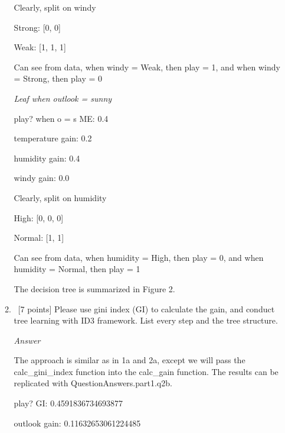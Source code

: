 \documentclass[12pt, fullpage,letterpaper]{article}
\begin{document}
\begin{enumerate}
\begin{enumerate}
    Clearly, split on windy
    
    \vspace{5mm}

    Strong: [0, 0]
    
    Weak: [1, 1, 1]
    
    \vspace{5mm}

    Can see from data, when windy = Weak, then play = 1, and when windy = Strong, then play = 0
    
    \vspace{5mm}
    \emph{Leaf when outlook = sunny}
    
    \vspace{5mm}
    
    play? when o = s ME:  0.4
    
    temperature gain: 0.2
    
    humidity gain: 0.4
    
    windy gain: 0.0
    
    \vspace{5mm}
    
    Clearly, split on humidity
    
    \vspace{5mm}
    
    High: [0, 0, 0]
    
    Normal: [1, 1]

    \vspace{5mm}

    Can see from data, when humidity = High, then play = 0, and when humidity = Normal, then play = 1
    
    \vspace{5mm}
    
    The decision tree is summarized in Figure 2.
	
	\item~[7 points] Please use gini index (GI) to calculate the gain, and conduct tree learning with ID3 framework. List every step and the tree structure.
	
	\emph{Answer}
	
	The approach is similar as in 1a and 2a, except we will pass the calc\_gini\_index function into the calc\_gain function. The results can be replicated with QuestionAnswers.part1.q2b.
	
	\vspace{5mm}
	
	play? GI:  0.4591836734693877
	
    outlook gain: 0.11632653061224485
    

\end{enumerate}
\end{enumerate}
\end{document}

